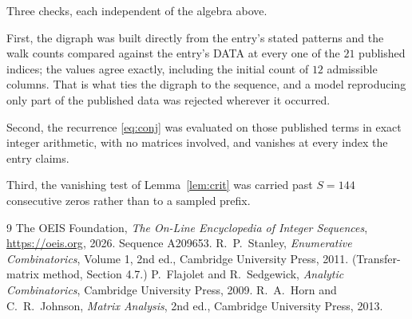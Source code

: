 \documentclass[11pt,a4paper]{article}
\theoremstyle{plain}
\theoremstyle{definition}
\begin{document}
Three checks, each independent of the algebra above.

First, the digraph was built directly from the entry's stated patterns and the walk counts
compared against the entry's DATA at every one of the $21$ published indices; the
values agree exactly, including the initial count of $12$ admissible columns. That is
what ties the digraph to the sequence, and a model reproducing only part of the published
data was rejected wherever it occurred.

Second, the recurrence \eqref{eq:conj} was evaluated on those published terms in exact
integer arithmetic, with no matrices involved, and vanishes at every index the entry claims.

Third, the vanishing test of Lemma~\ref{lem:crit} was carried past $S=144$ consecutive
zeros rather than to a sampled prefix.

\begin{thebibliography}{9}
 The OEIS Foundation, \emph{The On-Line Encyclopedia of Integer
Sequences}, \url{https://oeis.org}, 2026. Sequence A209653.
 R.~P.~Stanley, \emph{Enumerative Combinatorics}, Volume 1, 2nd ed.,
Cambridge University Press, 2011. (Transfer-matrix method, Section 4.7.)
 P.~Flajolet and R.~Sedgewick, \emph{Analytic Combinatorics}, Cambridge
University Press, 2009.
 R.~A.~Horn and C.~R.~Johnson, \emph{Matrix Analysis}, 2nd ed., Cambridge
University Press, 2013.
\end{thebibliography}
\end{document}
